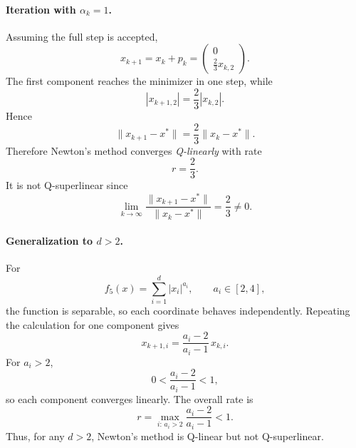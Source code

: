 \documentclass[12pt,a4paper]{article}
\begin{document}
\paragraph{Iteration with $\alpha_k=1$.}
Assuming the full step is accepted,
\[
x_{k+1}=x_k+p_k=
\begin{pmatrix}
0\\
\frac23 x_{k,2}
\end{pmatrix}.
\]
The first component reaches the minimizer in one step, while
\[
|x_{k+1,2}|=\frac23 |x_{k,2}|.
\]
Hence
\[
\|x_{k+1}-x^*\|
=\frac23 \|x_k-x^*\|.
\]
Therefore Newton’s method converges \emph{Q-linearly} with rate
\[
r=\frac23.
\]
It is not Q-superlinear since
\[
\lim_{k\to\infty}
\frac{\|x_{k+1}-x^*\|}{\|x_k-x^*\|}
=\frac23\neq0.
\]

\paragraph{Generalization to $d>2$.}
For
\[
f_5(x)=\sum_{i=1}^d |x_i|^{a_i},
\qquad a_i\in[2,4],
\]
the function is separable, so each coordinate behaves independently. 
Repeating the calculation for one component gives
\[
x_{k+1,i}
=
\frac{a_i-2}{a_i-1}\,x_{k,i}.
\]
For $a_i>2$,
\[
0<\frac{a_i-2}{a_i-1}<1,
\]
so each component converges linearly. The overall rate is
\[
r=\max_{i:\,a_i>2}
\frac{a_i-2}{a_i-1}
<1.
\]
Thus, for any $d>2$, Newton’s method is Q-linear but not Q-superlinear.
\end{document}
